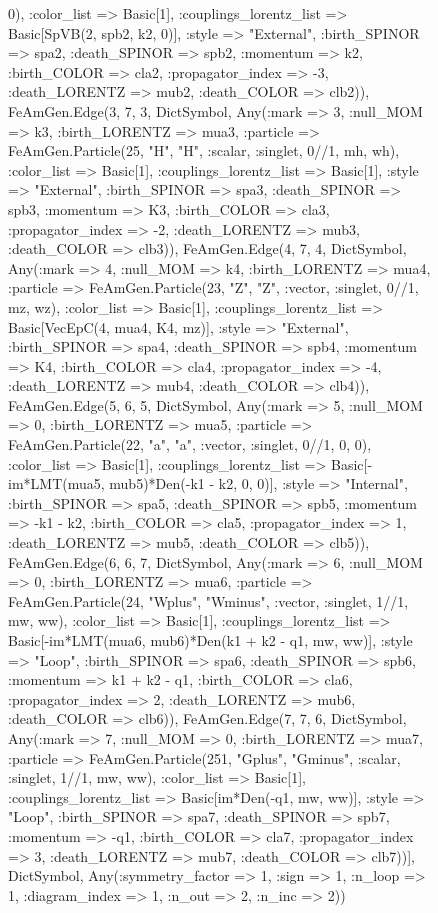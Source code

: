 \documentclass{revtex4}
\begin{document}
\begin{figure}[!htb]
\begin{center}
{0), :color_list => Basic[1], :couplings_lorentz_list => Basic[SpVB(2, spb2, k2, 0)], :style => "External", :birth_SPINOR => spa2, :death_SPINOR => spb2, :momentum => k2, :birth_COLOR => cla2, :propagator_index => -3, :death_LORENTZ => mub2, :death_COLOR => clb2)), FeAmGen.Edge(3, 7, 3, Dict{Symbol, Any}(:mark => 3, :null_MOM => k3, :birth_LORENTZ => mua3, :particle => FeAmGen.Particle(25, "H", "H", :scalar, :singlet, 0//1, mh, wh), :color_list => Basic[1], :couplings_lorentz_list => Basic[1], :style => "External", :birth_SPINOR => spa3, :death_SPINOR => spb3, :momentum => K3, :birth_COLOR => cla3, :propagator_index => -2, :death_LORENTZ => mub3, :death_COLOR => clb3)), FeAmGen.Edge(4, 7, 4, Dict{Symbol, Any}(:mark => 4, :null_MOM => k4, :birth_LORENTZ => mua4, :particle => FeAmGen.Particle(23, "Z", "Z", :vector, :singlet, 0//1, mz, wz), :color_list => Basic[1], :couplings_lorentz_list => Basic[VecEpC(4, mua4, K4, mz)], :style => "External", :birth_SPINOR => spa4, :death_SPINOR => spb4, :momentum => K4, :birth_COLOR => cla4, :propagator_index => -4, :death_LORENTZ => mub4, :death_COLOR => clb4)), FeAmGen.Edge(5, 6, 5, Dict{Symbol, Any}(:mark => 5, :null_MOM => 0, :birth_LORENTZ => mua5, :particle => FeAmGen.Particle(22, "a", "a", :vector, :singlet, 0//1, 0, 0), :color_list => Basic[1], :couplings_lorentz_list => Basic[-im*LMT(mua5, mub5)*Den(-k1 - k2, 0, 0)], :style => "Internal", :birth_SPINOR => spa5, :death_SPINOR => spb5, :momentum => -k1 - k2, :birth_COLOR => cla5, :propagator_index => 1, :death_LORENTZ => mub5, :death_COLOR => clb5)), FeAmGen.Edge(6, 6, 7, Dict{Symbol, Any}(:mark => 6, :null_MOM => 0, :birth_LORENTZ => mua6, :particle => FeAmGen.Particle(24, "Wplus", "Wminus", :vector, :singlet, 1//1, mw, ww), :color_list => Basic[1], :couplings_lorentz_list => Basic[-im*LMT(mua6, mub6)*Den(k1 + k2 - q1, mw, ww)], :style => "Loop", :birth_SPINOR => spa6, :death_SPINOR => spb6, :momentum => k1 + k2 - q1, :birth_COLOR => cla6, :propagator_index => 2, :death_LORENTZ => mub6, :death_COLOR => clb6)), FeAmGen.Edge(7, 7, 6, Dict{Symbol, Any}(:mark => 7, :null_MOM => 0, :birth_LORENTZ => mua7, :particle => FeAmGen.Particle(251, "Gplus", "Gminus", :scalar, :singlet, 1//1, mw, ww), :color_list => Basic[1], :couplings_lorentz_list => Basic[im*Den(-q1, mw, ww)], :style => "Loop", :birth_SPINOR => spa7, :death_SPINOR => spb7, :momentum => -q1, :birth_COLOR => cla7, :propagator_index => 3, :death_LORENTZ => mub7, :death_COLOR => clb7))], Dict{Symbol, Any}(:symmetry_factor => 1, :sign => 1, :n_loop => 1, :diagram_index => 1, :n_out => 2, :n_inc => 2)) 
}
\end{center}
\end{figure}
\end{document}
